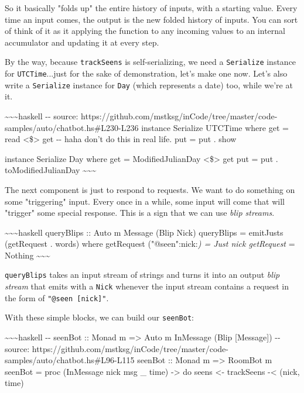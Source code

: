 \documentclass[]{article}
\begin{document}
So it basically "folds up" the entire history of inputs, with a starting value.
Every time an input comes, the output is the new folded history of inputs. You
can sort of think of it as it applying the function to any incoming values to an
internal accumulator and updating it at every step.

By the way, because \texttt{trackSeens} is self-serializing, we need a
\texttt{Serialize} instance for \texttt{UTCTime}...just for the sake of
demonstration, let's make one now. Let's also write a \texttt{Serialize}
instance for \texttt{Day} (which represents a date) too, while we're at it.

\textasciitilde{}\textasciitilde{}\textasciitilde{}haskell -\/- source:
https://github.com/mstksg/inCode/tree/master/code-samples/auto/chatbot.hs\#L230-L236
instance Serialize UTCTime where get = read \textless{}\$\textgreater{} get -\/-
haha don't do this in real life. put = put . show

instance Serialize Day where get = ModifiedJulianDay \textless{}\$\textgreater{}
get put = put . toModifiedJulianDay
\textasciitilde{}\textasciitilde{}\textasciitilde{}

The next component is just to respond to requests. We want to do something on
some "triggering" input. Every once in a while, some input will come that will
"trigger" some special response. This is a sign that we can use \emph{blip
streams}.

\textasciitilde{}\textasciitilde{}\textasciitilde{}haskell queryBlips :: Auto m
Message (Blip Nick) queryBlips = emitJusts (getRequest . words) where getRequest
("@seen":nick:\emph{) = Just nick getRequest } = Nothing
\textasciitilde{}\textasciitilde{}\textasciitilde{}

\texttt{queryBlips} takes an input stream of strings and turns it into an output
\emph{blip stream} that emits with a \texttt{Nick} whenever the input stream
contains a request in the form of \texttt{"@seen\ {[}nick{]}"}.

With these simple blocks, we can build our \texttt{seenBot}:

\textasciitilde{}\textasciitilde{}\textasciitilde{}haskell -\/- seenBot :: Monad
m =\textgreater{} Auto m InMessage (Blip {[}Message{]}) -\/- source:
https://github.com/mstksg/inCode/tree/master/code-samples/auto/chatbot.hs\#L96-L115
seenBot :: Monad m =\textgreater{} RoomBot m seenBot = proc (InMessage nick msg
\_ time) -\textgreater{} do seens \textless{}- trackSeens -\textless{} (nick,
time)
\end{document}
